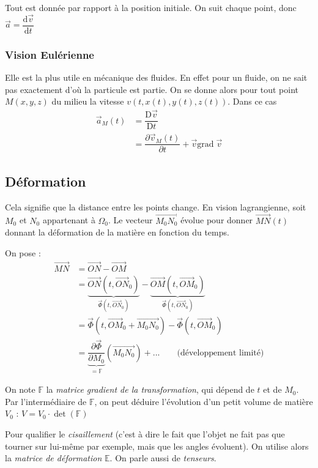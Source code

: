 \documentclass{article}
\newcommand{\deriv}{\mathrm{d}}
\newcommand{\Deriv}{\mathrm{D}}
\newcommand{\grad}{\text{grad}\;}
\begin{document}
Tout est donnée par rapport à la position initiale. On suit chaque point, donc $\vec{a}=\dfrac{\deriv \vec{v}}{\deriv t}$


\subsubsection{Vision Eulérienne}
Elle est la plus utile en mécanique des fluides. En effet pour un fluide, on ne sait pas exactement d'où la particule est partie. On se donne alors pour tout point $M(x,y,z)$ du milieu la vitesse $v(t,x(t),y(t),z(t))$. Dans ce cas
\begin{align*}
\vec{a}_M (t) & = \dfrac{\Deriv \vec{v}}{\Deriv t}\\
& = \dfrac{\partial \vec{v}_M(t)}{\partial t} + \vec{v} \grad \vec{v}
\end{align*}


\subsection{Déformation}
Cela signifie que la distance entre les points change. En vision lagrangienne, soit $M_0$ et $N_0$ appartenant à $\Omega_0$. Le vecteur $\overrightarrow{M_0N_0}$ évolue pour donner $\overrightarrow{MN}(t)$ donnant la déformation de la matière en fonction du temps.

On pose :
\begin{align*}
\overrightarrow{MN} & = \overrightarrow{ON} - \overrightarrow{OM}\\
& = \underbrace{\overrightarrow{ON}(t,\overrightarrow{ON}_0)}_{\vec{\Phi}(t,\overrightarrow{ON}_0)} - \underbrace{\overrightarrow{OM}(t,\overrightarrow{OM}_0)}_{\vec{\Phi}(t,\overrightarrow{ON}_0)}\\
& = \vec{\Phi}(t, \overrightarrow{OM}_0 + \overrightarrow{M_0N_0}) - \vec{\Phi}(t, \overrightarrow{OM}_0)\\
& = \underbrace{\dfrac{\partial \vec{\Phi}}{\partial M_0}}_{= \mathbb{F}} (\overrightarrow{M_0N_0}) + ... \qquad \text{(développement limité)}
\end{align*}

On note $\mathbb{F}$ la \emph{matrice gradient de la transformation}, qui dépend de $t$ et de $M_0$. 
Par l'intermédiaire de $\mathbb{F}$, on peut déduire l'évolution d'un petit volume de matière $V_0$ :  $V = V_0 \cdot \det (\mathbb{F})$

Pour qualifier le \emph{cisaillement} (c'est à dire le fait que l'objet ne fait pas que tourner sur lui-même par exemple, mais que les angles évoluent). On utilise alors la \emph{matrice de déformation} $\mathbb{E}$. On parle aussi de \emph{tenseurs}.
\end{document}
